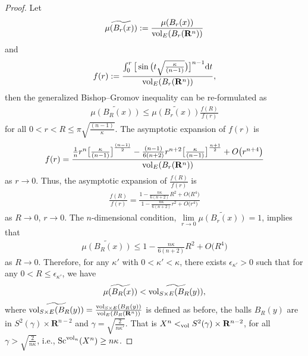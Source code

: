 \documentclass[10pt,a4paper]{amsart}
\begin{document}
\begin{proof}
Let
\begin{gather*}
\widetilde{\mu(B_r(x))}:=\frac{\mu(B_r(x))}{{\rm vol}_E(B_r(\mathbf{R}^n))}
\end{gather*}
 and
 \begin{gather*}
 f(r):= \frac{\int_0^r \big[\sin\big(t\sqrt{\frac{\kappa}{(n-1)}}\big)\big] ^{n-1}{\rm d}t}{{\rm vol}_E(B_r(\mathbf{R}^n))},
 \end{gather*}
 then the generalized Bishop--Gromov inequality can be re-formulated as
 \begin{gather*}
 \widetilde{\mu(B_R(x))} \leq \widetilde{\mu(B_r(x))} \frac{f(R)}{f(r)}
 \end{gather*}
 for all $ 0< r <R\leq \pi \sqrt{\frac{(n-1)}{\kappa}}$. The asymptotic expansion of $f(r)$ is
\begin{gather*}
f(r)= \frac{\frac{1}{n}r^n\big[\frac{\kappa}{(n-1)}\big]^{\frac{(n-1)}{2}}-\frac{(n-1)}{6(n+2)}r^{n+2} \big[\frac{\kappa}{(n-1)}\big]^{\frac{n+1}{2}}+O\big(r^{n+4}\big)}{{\rm vol}_E(B_r(\mathbf{R}^n))}
\end{gather*}
as $ r\rightarrow 0$.
 Thus, the asymptotic expansion of $\frac{f(R)}{f(r)}$ is
 \begin{gather*}
 \frac{f(R)}{f(r)}= \frac{1-\frac{n\kappa}{6(n+2)}R^2+ O\big(R^4\big)}{1-\frac{n\kappa}{6(n+2)}r^2+ O\big(r^4\big)}
 \end{gather*}
 as $R \to 0$, $r \to 0$.
 The $n$-dimensional condition, $\lim\limits_{r\to 0} \widetilde{\mu(B_r(x))}=1$, implies that
 \begin{gather*}
 \widetilde{\mu(B_R(x))}\leq 1-\frac{n\kappa}{6(n+2)}R^2+ O\big(R^4\big)
 \end{gather*}
as $R\to 0$. Therefore, for any $\kappa'$ with $0<\kappa' < \kappa$, there exists $\epsilon_{\kappa'} >0$ such that for any $0<R\leq \epsilon_{\kappa'}$, we have
 \begin{gather*}
\widetilde{\mu(B_R(x))}<\widetilde{{\rm vol}_{S\times E}(B_{R}(y))},
 \end{gather*}
where $\widetilde{{\rm vol}_{S\times E}(B_{R}(y))}= \frac{ {\rm vol}_{S\times E}(B_{R}(y))}{{\rm vol}_E(B_{R}(\mathbf{R}^n))}$ is defined as before, the balls $B_{R}(y)$ are in $S^2(\gamma)\times \mathbf{R}^{n-2}$ and $\gamma=\sqrt{\frac{2}{n\kappa'}}$.
That is $X^n <_{\rm vol} S^2(\gamma)\times \mathbf{R}^{n-2}$, for all $\gamma>\sqrt{\frac{2}{n\kappa}}$, i.e., ${\rm Sc}^{{\rm vol}_n}(X^n)\geq n\kappa$.


\end{proof}
\end{document}
